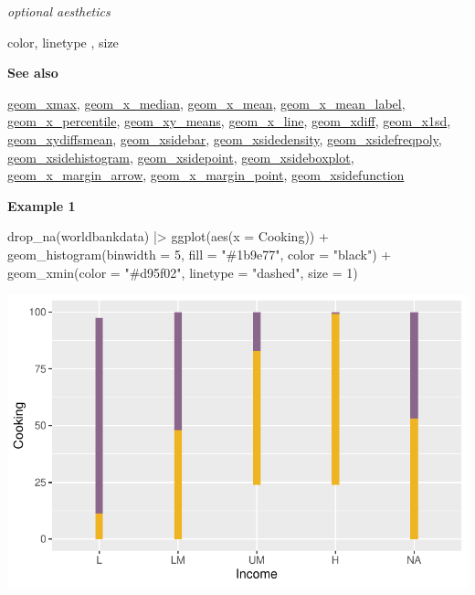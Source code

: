 \documentclass[
  letterpaper,
  DIV=11,
  numbers=noendperiod]{scrreprt}
\newenvironment{Shaded}{\begin{snugshade}}{\end{snugshade}}
\newcommand{\AttributeTok}[1]{\textcolor[rgb]{0.40,0.45,0.13}{#1}}
\newcommand{\DecValTok}[1]{\textcolor[rgb]{0.68,0.00,0.00}{#1}}
\newcommand{\FunctionTok}[1]{\textcolor[rgb]{0.28,0.35,0.67}{#1}}
\newcommand{\NormalTok}[1]{\textcolor[rgb]{0.00,0.23,0.31}{#1}}
\newcommand{\SpecialCharTok}[1]{\textcolor[rgb]{0.37,0.37,0.37}{#1}}
\newcommand{\StringTok}[1]{\textcolor[rgb]{0.13,0.47,0.30}{#1}}
\begin{document}
\emph{optional aesthetics}

color, linetype , size

\textbf{See also}

\href{@xmax}{geom\_xmax}, \href{@x_median}{geom\_x\_median},
\href{@x_mean}{geom\_x\_mean},
\href{@x_mean_label}{geom\_x\_mean\_label},
\href{@x_percentile}{geom\_x\_percentile},
\href{@xy_means}{geom\_xy\_means}, \href{@x_line}{geom\_x\_line},
\href{@xdiff}{geom\_xdiff}, \href{@x1sd}{geom\_x1sd},
\href{@xydiffsmean}{geom\_xydiffsmean},
\href{@xsidebar}{geom\_xsidebar},
\href{@xsidedensity}{geom\_xsidedensity},
\href{@xsidefreqpoly}{geom\_xsidefreqpoly},
\href{@xsidehistogram}{geom\_xsidehistogram},
\href{@xsidepoint}{geom\_xsidepoint},
\href{@xsideboxplot}{geom\_xsideboxplot},
\href{@x_margin_arrow}{geom\_x\_margin\_arrow},
\href{@x_margin_point}{geom\_x\_margin\_point},
\href{@xsidefunction}{geom\_xsidefunction}

\textbf{Example 1}

\begin{Shaded}
\begin{Highlighting}[]
\FunctionTok{drop\_na}\NormalTok{(worldbankdata) }\SpecialCharTok{|\textgreater{}}
\FunctionTok{ggplot}\NormalTok{(}\FunctionTok{aes}\NormalTok{(}\AttributeTok{x =}\NormalTok{ Cooking)) }\SpecialCharTok{+}
  \FunctionTok{geom\_histogram}\NormalTok{(}\AttributeTok{binwidth =} \DecValTok{5}\NormalTok{, }\AttributeTok{fill =} \StringTok{"\#1b9e77"}\NormalTok{, }\AttributeTok{color =} \StringTok{"black"}\NormalTok{) }\SpecialCharTok{+} 
  \FunctionTok{geom\_xmin}\NormalTok{(}\AttributeTok{color =} \StringTok{"\#d95f02"}\NormalTok{, }\AttributeTok{linetype =} \StringTok{"dashed"}\NormalTok{, }\AttributeTok{size =} \DecValTok{1}\NormalTok{) }
\end{Highlighting}
\end{Shaded}

\includegraphics{x_files/figure-pdf/unnamed-chunk-4-1.pdf}
\end{document}
